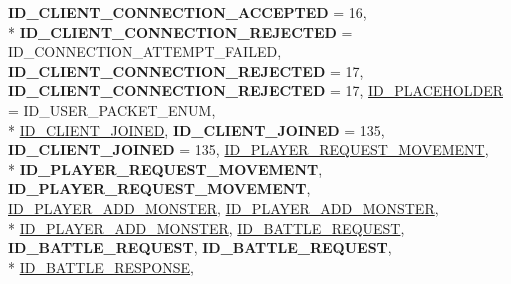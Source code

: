 \begin{DoxyCompactItemize}
{\bfseries I\-D\-\_\-\-C\-L\-I\-E\-N\-T\-\_\-\-C\-O\-N\-N\-E\-C\-T\-I\-O\-N\-\_\-\-A\-C\-C\-E\-P\-T\-E\-D} = 16, 
\\*
{\bfseries I\-D\-\_\-\-C\-L\-I\-E\-N\-T\-\_\-\-C\-O\-N\-N\-E\-C\-T\-I\-O\-N\-\_\-\-R\-E\-J\-E\-C\-T\-E\-D} = I\-D\-\_\-\-C\-O\-N\-N\-E\-C\-T\-I\-O\-N\-\_\-\-A\-T\-T\-E\-M\-P\-T\-\_\-\-F\-A\-I\-L\-E\-D, 
{\bfseries I\-D\-\_\-\-C\-L\-I\-E\-N\-T\-\_\-\-C\-O\-N\-N\-E\-C\-T\-I\-O\-N\-\_\-\-R\-E\-J\-E\-C\-T\-E\-D} = 17, 
{\bfseries I\-D\-\_\-\-C\-L\-I\-E\-N\-T\-\_\-\-C\-O\-N\-N\-E\-C\-T\-I\-O\-N\-\_\-\-R\-E\-J\-E\-C\-T\-E\-D} = 17, 
\hyperlink{namespace_champ_net_plugin_a2ade5cfa7cf6c25ab7236c6b54a57821a6acf78ef40fd50b2e823237ea828fc1b}{I\-D\-\_\-\-P\-L\-A\-C\-E\-H\-O\-L\-D\-E\-R} = I\-D\-\_\-\-U\-S\-E\-R\-\_\-\-P\-A\-C\-K\-E\-T\-\_\-\-E\-N\-U\-M, 
\\*
\hyperlink{namespace_champ_net_plugin_a2ade5cfa7cf6c25ab7236c6b54a57821aeb7ac0bb4cb955cc0b7a3bebc9f14774}{I\-D\-\_\-\-C\-L\-I\-E\-N\-T\-\_\-\-J\-O\-I\-N\-E\-D}, 
{\bfseries I\-D\-\_\-\-C\-L\-I\-E\-N\-T\-\_\-\-J\-O\-I\-N\-E\-D} = 135, 
{\bfseries I\-D\-\_\-\-C\-L\-I\-E\-N\-T\-\_\-\-J\-O\-I\-N\-E\-D} = 135, 
\hyperlink{namespace_champ_net_plugin_a2ade5cfa7cf6c25ab7236c6b54a57821abaa5b813ea0118cdccbb8f80d461fea8}{I\-D\-\_\-\-P\-L\-A\-Y\-E\-R\-\_\-\-R\-E\-Q\-U\-E\-S\-T\-\_\-\-M\-O\-V\-E\-M\-E\-N\-T}, 
\\*
{\bfseries I\-D\-\_\-\-P\-L\-A\-Y\-E\-R\-\_\-\-R\-E\-Q\-U\-E\-S\-T\-\_\-\-M\-O\-V\-E\-M\-E\-N\-T}, 
{\bfseries I\-D\-\_\-\-P\-L\-A\-Y\-E\-R\-\_\-\-R\-E\-Q\-U\-E\-S\-T\-\_\-\-M\-O\-V\-E\-M\-E\-N\-T}, 
\hyperlink{namespace_champ_net_plugin_a2ade5cfa7cf6c25ab7236c6b54a57821a942496ffc9e2a24c46c0bfd3f24460f6}{I\-D\-\_\-\-P\-L\-A\-Y\-E\-R\-\_\-\-A\-D\-D\-\_\-\-M\-O\-N\-S\-T\-E\-R}, 
\hyperlink{namespace_champ_net_plugin_a2ade5cfa7cf6c25ab7236c6b54a57821ad42c079bb7459dbaf419eeb2e845f3e2}{I\-D\-\_\-\-P\-L\-A\-Y\-E\-R\-\_\-\-A\-D\-D\-\_\-\-M\-O\-N\-S\-T\-E\-R}, 
\\*
\hyperlink{namespace_champ_net_plugin_a2ade5cfa7cf6c25ab7236c6b54a57821ad42c079bb7459dbaf419eeb2e845f3e2}{I\-D\-\_\-\-P\-L\-A\-Y\-E\-R\-\_\-\-A\-D\-D\-\_\-\-M\-O\-N\-S\-T\-E\-R}, 
\hyperlink{namespace_champ_net_plugin_a2ade5cfa7cf6c25ab7236c6b54a57821a1099c58a5b9ad43616e67c5865ce539a}{I\-D\-\_\-\-B\-A\-T\-T\-L\-E\-\_\-\-R\-E\-Q\-U\-E\-S\-T}, 
{\bfseries I\-D\-\_\-\-B\-A\-T\-T\-L\-E\-\_\-\-R\-E\-Q\-U\-E\-S\-T}, 
{\bfseries I\-D\-\_\-\-B\-A\-T\-T\-L\-E\-\_\-\-R\-E\-Q\-U\-E\-S\-T}, 
\\*
\hyperlink{namespace_champ_net_plugin_a2ade5cfa7cf6c25ab7236c6b54a57821a4d61a30352b41b284f20eeb6d46d0b18}{I\-D\-\_\-\-B\-A\-T\-T\-L\-E\-\_\-\-R\-E\-S\-P\-O\-N\-S\-E}, 

\end{DoxyCompactItemize}
